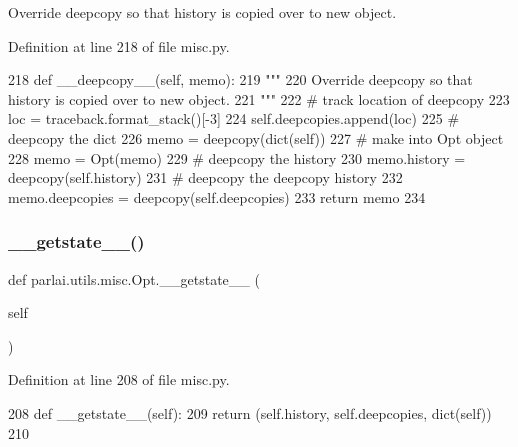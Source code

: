 \begin{DoxyVerb}Override deepcopy so that history is copied over to new object.
\end{DoxyVerb}
 

Definition at line 218 of file misc.\+py.


\begin{DoxyCode}
218     \textcolor{keyword}{def }\_\_deepcopy\_\_(self, memo):
219         \textcolor{stringliteral}{"""}
220 \textcolor{stringliteral}{        Override deepcopy so that history is copied over to new object.}
221 \textcolor{stringliteral}{        """}
222         \textcolor{comment}{# track location of deepcopy}
223         loc = traceback.format\_stack()[-3]
224         self.deepcopies.append(loc)
225         \textcolor{comment}{# deepcopy the dict}
226         memo = deepcopy(dict(self))
227         \textcolor{comment}{# make into Opt object}
228         memo = Opt(memo)
229         \textcolor{comment}{# deepcopy the history}
230         memo.history = deepcopy(self.history)
231         \textcolor{comment}{# deepcopy the deepcopy history}
232         memo.deepcopies = deepcopy(self.deepcopies)
233         \textcolor{keywordflow}{return} memo
234 
\end{DoxyCode}
\mbox{\label{classparlai_1_1utils_1_1misc_1_1Opt_a7fae2d1b6ffb48970e59923787adb905}} 
\subsubsection{\texorpdfstring{\+\_\+\+\_\+getstate\+\_\+\+\_\+()}{\_\_getstate\_\_()}}
{\footnotesize\ttfamily def parlai.\+utils.\+misc.\+Opt.\+\_\+\+\_\+getstate\+\_\+\+\_\+ (\begin{DoxyParamCaption}\item[{}]{self }\end{DoxyParamCaption})}



Definition at line 208 of file misc.\+py.


\begin{DoxyCode}
208     \textcolor{keyword}{def }\_\_getstate\_\_(self):
209         \textcolor{keywordflow}{return} (self.history, self.deepcopies, dict(self))
210 
\end{DoxyCode}
\mbox{\label{classparlai_1_1utils_1_1misc_1_1Opt_a1304900ba795187adb8bd4a564a435a8}} 
